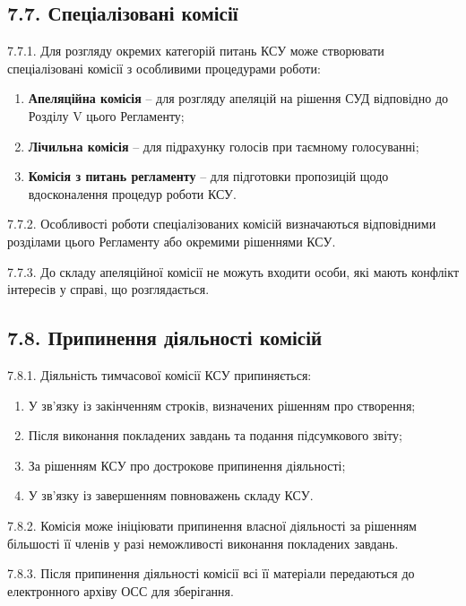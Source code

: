 \subsection*{7.7. Спеціалізовані комісії}
    7.7.1. Для розгляду окремих категорій питань КСУ може створювати спеціалізовані комісії з особливими процедурами роботи:

        \begin{enumerate}[label=\alph*)]
            \item \textbf{Апеляційна комісія} -- для розгляду апеляцій на рішення СУД відповідно до Розділу V цього Регламенту;
            \item \textbf{Лічильна комісія} -- для підрахунку голосів при таємному голосуванні;
            \item \textbf{Комісія з питань регламенту} -- для підготовки пропозицій щодо вдосконалення процедур роботи КСУ.
        \end{enumerate}

    7.7.2. Особливості роботи спеціалізованих комісій визначаються відповідними розділами цього Регламенту або окремими рішеннями КСУ.

    7.7.3. До складу апеляційної комісії не можуть входити особи, які мають конфлікт інтересів у справі, що розглядається.

\subsection*{7.8. Припинення діяльності комісій}
    7.8.1. Діяльність тимчасової комісії КСУ припиняється:

        \begin{enumerate}[label=\alph*)]
            \item У зв'язку із закінченням строків, визначених рішенням про створення;
            \item Після виконання покладених завдань та подання підсумкового звіту;
            \item За рішенням КСУ про дострокове припинення діяльності;
            \item У зв'язку із завершенням повноважень складу КСУ.
        \end{enumerate}

    7.8.2. Комісія може ініціювати припинення власної діяльності за рішенням більшості її членів у разі неможливості виконання покладених завдань.

    7.8.3. Після припинення діяльності комісії всі її матеріали передаються до електронного архіву ОСС для зберігання.